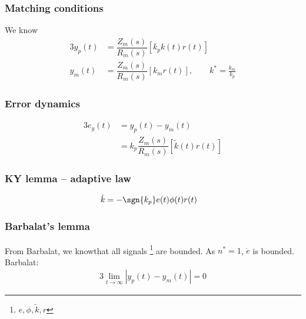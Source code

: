 \subsubsection*{Matching conditions}
\begin{figure}[H]
    \centering
    
\end{figure}

We know
\begin{alignat*}{3}
y_p(t) &= \dfrac{Z_m(s)}{R_m(s)} \left[ k_p k(t) r(t) \right]\\
y_m(t) &= \dfrac{Z_m(s)}{R_m(s)} \left[ k_m r(t) \right], \qquad k^* = \frac{k_m}{k_p}
\end{alignat*}

\subsubsection*{Error dynamics}
\begin{alignat*}{3}
e_y(t) &= y_p(t) - y_m(t)\\
    &= k_p \dfrac{Z_m(s)}{R_m(s)} \left[ \tilde{k}(t) r(t) \right]
\end{alignat*}

\subsubsection*{KY lemma -- adaptive law}
\begin{alignat*}{3}
\dot{k} &= -\sgn{k_p} e(t) \phi(t) r(t)
\end{alignat*}

\subsubsection*{Barbalat's lemma}
From Barbalat, we knowthat all signals%
    \footnote{$e, \phi, \tilde{k}, r$}
are bounded.
As $n^* = 1$, $\dot{e}$ is bounded.
Barbalat:
\begin{alignat*}{3}
\lim_{t \rightarrow \infty} |y_p(t) - y_m(t)| = 0
\end{alignat*}


